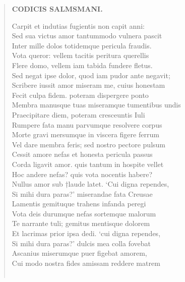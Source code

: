 \documentclass[11pt, a4paper]{report}
\begin{document}
\begin{verse}
    \begin{center} \textbf{CODICIS SALMSMANI.} \end{center}Carpit et indutias fugientis non capit anni: \\ Sed sua victus amor tantummodo vulnera pascit \\ Inter mille dolos totidemque pericula fraudis. \\ Vota queror: vellem tacitis peritura querellis \\ Flere domo, vellem  \lbrack iam \rbrack  tabida fundere fletus. \\ Sed negat ipse dolor, quod iam pudor ante negavit; \\ Scribere iussit amor miseram me, cuius honestam \\ Fecit culpa fidem. poteram dispergere ponto \\ Membra manusque tuas miseramque tumentibus undis \\ Praecipitare diem, poteram cresceuntis Iuli \\ Rumpere fata manu parvumque resolvere corpus \\ Morte gravi mersumque in viscera figere ferrum \\ Vel dare membra feris; sed nostro pectore pulsum \\ Cessit amore nefas et honesta pericula passus \\ Corda ligavit amor. quis tantum in hospite vellet \\ Hoc andere nefas? quis vota nocentis habere? \\ Nullus amor sub †laude latet. ‘Cui digna rependes, \\ Si mihi dura paras?’ miserandae fata Creusae \\ Lamentis gemituque trahens infanda peregi \\ Vota deis durumque nefas sortemque malorum \\ Te narrante tuli; gemitus mentisque dolorem \\ Et lacrimas prior ipsa dedi. ‘cui digna rependes, \\ Si mihi dura paras?’ dulcis mea colla fovebat \\ Ascanius miserumque puer figebat amorem, \\ Cui modo nostra fides amissam reddere matrem \\ 
        ﻿\pagebreak 

\end{verse}
\end{document}
